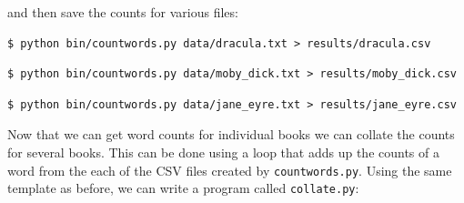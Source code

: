 \documentclass[
]{krantz}
\begin{document}
and then save the counts for various files:

\begin{verbatim}
$ python bin/countwords.py data/dracula.txt > results/dracula.csv
\end{verbatim}

\begin{verbatim}
$ python bin/countwords.py data/moby_dick.txt > results/moby_dick.csv
\end{verbatim}

\begin{verbatim}
$ python bin/countwords.py data/jane_eyre.txt > results/jane_eyre.csv
\end{verbatim}

Now that we can get word counts for individual books
we can collate the counts for several books.
This can be done using a loop that adds up the counts of a word
from the each of the CSV files created by \texttt{countwords.py}.
Using the same template as before,
we can write a program called \texttt{collate.py}:
\end{document}

